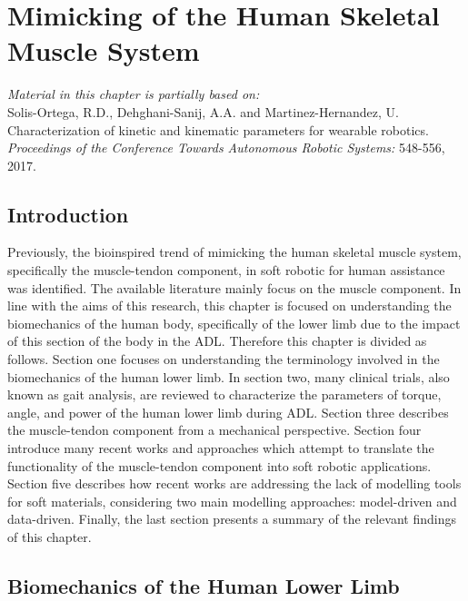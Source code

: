 \chapter{Mimicking of the Human Skeletal Muscle System}

\begin{center}
    \textit{Material in this chapter is partially based on:}\\
    Solis-Ortega, R.D., Dehghani-Sanij, A.A. and Martinez-Hernandez, U.\\
    Characterization of kinetic and kinematic parameters for wearable robotics.\\
    \textit{Proceedings of the Conference Towards Autonomous Robotic Systems:} 548-556, 2017. \cite{solis2017characterization}\\
\end{center}

\section{Introduction}

Previously, the bioinspired trend of mimicking the human skeletal muscle system, specifically the muscle-tendon component, in soft robotic for human assistance was identified. The available literature mainly focus on the muscle component. In line with the aims of this research, this chapter is focused on understanding the biomechanics of the human body, specifically of the lower limb due to the impact of this section of the body in the ADL. Therefore this chapter is divided as follows.
Section one focuses on understanding the terminology involved in the biomechanics of the human lower limb. In section two, many clinical trials, also known as gait analysis, are reviewed to characterize the parameters of torque, angle, and power of the human lower limb during ADL. Section three describes the muscle-tendon component from a mechanical perspective. Section four introduce many recent works and approaches which attempt to translate the functionality of the muscle-tendon component into soft robotic applications. Section five describes how recent works are addressing the lack of modelling tools for soft materials, considering two main modelling approaches: model-driven and data-driven. Finally, the last section presents a summary of the relevant findings of this chapter.

\section{Biomechanics of the Human Lower Limb}

